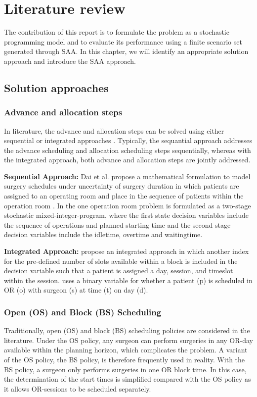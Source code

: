 \section{Literature review}
The contribution of this report is to formulate the problem as a stochastic programming model and to evaluate its performance using a finite scenario set generated through SAA. In this chapter, we will identify an appropriate solution approach and introduce the SAA approach. 

\subsection{Solution approaches}
\subsubsection{Advance and allocation steps}
In literature, the advance and allocation steps can be solved using either sequential or integrated approaches \cite{Molina-Pariente2026}. Typically, the sequantial approach addresses the advance scheduling and allocation scheduling steps sequentially, whereas with the integrated approach, both advance and allocation steps are jointly addressed.

\textbf{Sequential Approach:}
Dai et al. propose a mathematical formulation to model surgery schedules under uncertainty of surgery duration in which patients are assigned to an operating room and place in the sequence of patients within the operation room \cite{DAI2025107098}.
In \cite{Denton2006} the one operation room problem is formulated as a two-stage stochastic mixed-integer-program, where the first state decision variables include the sequence of operations and planned starting time and the second stage decision variables include the idletime, overtime and waitingtime.

\textbf{Integrated Approach:}
\cite{Moosavi2018216} propose an integrated approach in which another index for the pre-defined number of slots available within a block is included in the decision variable such that a patient is assigned a day, session, and timeslot within the session. \cite{Vali-Siar2018549} uses a binary variable for whether a patient (p) is scheduled in OR (o) with surgeon (s) at time (t) on day (d). 

\subsubsection{Open (OS) and Block (BS) Scheduling}
Traditionally, open (OS) and block (BS) scheduling policies are considered in the literature. Under the OS policy, any surgeon can perform surgeries in any OR-day available within the planning horizon, which complicates the problem. A variant of the OS policy, the BS policy, is therefore frequently used in reality. With the BS policy, a surgeon only performs surgeries in one OR block time. In this case, the determination of the start times is simplified compared with the OS policy as it allows OR-sessions to be scheduled separately. 

